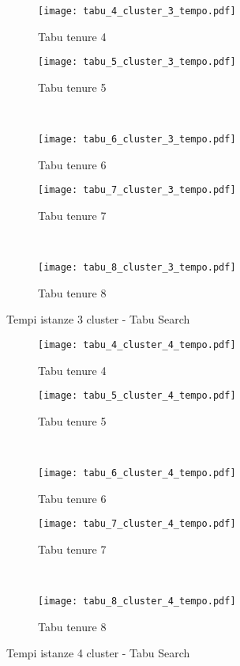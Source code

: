\begin{figure}[H]
	\centering
	\begin{subfigure}[b]{.45\textwidth}
		\texttt{[image: tabu\_4\_cluster\_3\_tempo.pdf]}
		\caption{Tabu tenure 4}
	\end{subfigure}
	\quad
	\begin{subfigure}[b]{.45\textwidth}
		\texttt{[image: tabu\_5\_cluster\_3\_tempo.pdf]}
		\caption{Tabu tenure 5}
	\end{subfigure}
	\\
	\begin{subfigure}[b]{.45\textwidth}
		\texttt{[image: tabu\_6\_cluster\_3\_tempo.pdf]}
		\caption{Tabu tenure 6}
	\end{subfigure}
	\quad
	\begin{subfigure}[b]{.45\textwidth}
		\texttt{[image: tabu\_7\_cluster\_3\_tempo.pdf]}
		\caption{Tabu tenure 7}
	\end{subfigure}
	\\
	\begin{subfigure}[b]{.45\textwidth}
		\texttt{[image: tabu\_8\_cluster\_3\_tempo.pdf]}
		\caption{Tabu tenure 8}
	\end{subfigure}
	\caption{Tempi istanze 3 cluster - Tabu Search}
	\label{fig:tempi tabu cluster 3}
\end{figure}

\begin{figure}[H]
	\centering
	\begin{subfigure}[b]{.45\textwidth}
		\texttt{[image: tabu\_4\_cluster\_4\_tempo.pdf]}
		\caption{Tabu tenure 4}
	\end{subfigure}
	\quad
	\begin{subfigure}[b]{.45\textwidth}
		\texttt{[image: tabu\_5\_cluster\_4\_tempo.pdf]}
		\caption{Tabu tenure 5}
	\end{subfigure}
	\\
	\begin{subfigure}[b]{.45\textwidth}
		\texttt{[image: tabu\_6\_cluster\_4\_tempo.pdf]}
		\caption{Tabu tenure 6}
	\end{subfigure}
	\quad
	\begin{subfigure}[b]{.45\textwidth}
		\texttt{[image: tabu\_7\_cluster\_4\_tempo.pdf]}
		\caption{Tabu tenure 7}
	\end{subfigure}
	\\
	\begin{subfigure}[b]{.45\textwidth}
		\texttt{[image: tabu\_8\_cluster\_4\_tempo.pdf]}
		\caption{Tabu tenure 8}
	\end{subfigure}
	\caption{Tempi istanze 4 cluster - Tabu Search}
	\label{fig:tempi tabu cluster 4}
\end{figure}

